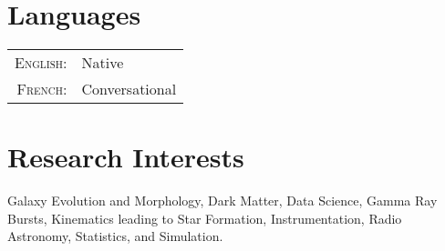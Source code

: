 \documentclass[a4paper,10pt]{article} %
\begin{document}

\section{Languages}

\begin{tabular}{rl}

\textsc{English:} & Native\\

\textsc{French:} & Conversational\\

\end{tabular}
\bigskip


\section{Research Interests}

Galaxy Evolution and Morphology, Dark Matter, Data Science, Gamma Ray Bursts,  Kinematics leading to Star Formation, Instrumentation, Radio Astronomy, Statistics, and Simulation.



\end{document}
